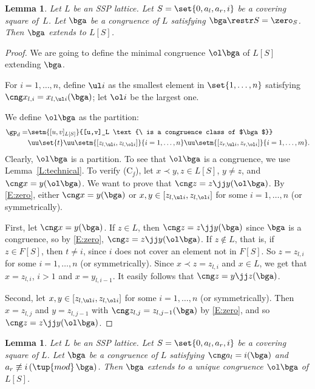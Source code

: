 \documentclass{amsart}
\theoremstyle{plain}
\newtheorem{lemma}[theorem]{Lemma}
\theoremstyle{definition}
\begin{document}
\begin{lemma}\label{L:extend2}
Let $L$ be an SSP lattice. 
Let $S = \set{0,a_l,a_r,i}$ be a covering square of~$L$. 
Let $\bga$ be a congruence of $L$ satisfying  $\bga \restr S = \zero_S$.
Then $\bga$ extends to  $L[S]$.
\end{lemma}

\begin{proof}
We are going to define the minimal congruence ${\ol \bga}$ 
of $L[S]$ extending $\bga$.

For $i = 1, \dots, n$, define $\ul i$ 
as the smallest element in $\set{1, \dots, n}$
satisfying $\cng x_{l,i} = x_{l,\ul i}(\bga)$; 
let $\ol i$ be the largest one.
 
We define ${\ol \bga}$ as the partition:
\begin{align}\label{E:zero}
  \gp_d =  &\setm{[u,v]_{L[S]}}{[u,v]_L 
  \text{\ is a congruence class of $\bga$}}\\
 & \uu \set{t}
  \uu \setm{[z_{l,\ul i}, z_{l,\ol i}]}{i=1, \dots, n}
   \uu \setm{[z_{r,\ul i}, z_{r,\ol i}]}{i=1, \dots, m}.\notag
\end{align}
Clearly, ${\ol \bga}$ is a partition. 
To see that ${\ol \bga}$ is a congruence, we use Lemma~\ref{L:technical}.
To verify (C${}_\jj$), let $x \prec y,z \in L[S]$, $y \neq z$, 
and $\cng x = y ({\ol \bga})$. We want to prove that $\cng z = z \jj y ({\ol \bga})$.
By \eqref{E:zero}, either $\cng x=y(\bga)$ 
or $x,y \in [z_{l,\ul i}, z_{l,\ol i}]$ for some $i=1, \dots, n$
(or symmetrically).

First, let $\cng x=y(\bga)$. If $z \in L$, then $\cng z = z \jj y (\bga)$
since $\bga$ is a congruence, so by \eqref{E:zero}, 
$\cng z = z \jj y ({\ol \bga})$. If $z \nin L$, that is, if $z \in F[S]$,
then $t \neq i$, since $i$ does not cover an element not in $F[S]$.
So $z = z_{l, i}$ for some $i=1, \dots, n$ (or symmetrically).
Since $x \prec z = z_{l, i}$ and $x \in L$, 
we get that $x = z_{l, i}$, $i > 1$ and $x = y_{l, i-1}$. 
It easily follows that $\cng z=y\jj z(\bga)$.

Second, let $x,y \in [z_{l,\ul i}, z_{l,\ol i}]$ for some $i=1, \dots, n$
(or symmetrically). Then $x = z_{l, j}$ and $y = z_{l, j-1}$
with $\cng z_{l, j}=z_{l, j-1}(\bga)$ by \eqref{E:zero}, 
and so $\cng z = z \jj y ({\ol \bga})$.
\end{proof}

\begin{lemma}\label{L:extend3}
Let $L$ be an SSP lattice. 
Let $S = \set{0,a_l,a_r,i}$ be a covering square of $L$. 
Let $\bga$ be a congruence of $L$ satisfying  
$\cng a_l=i(\bga)$ and $a_r \not\equiv i\,(\tup{mod}\, \bga)$.
Then $\bga$ extends to a unique congruence ${\ol \bga}$ of $L[S]$.
\end{lemma}
\end{document}
